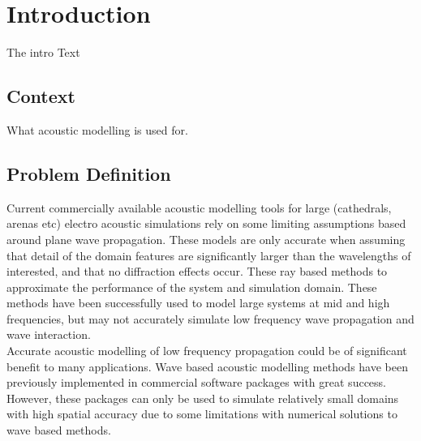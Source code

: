 \chapter{Introduction}

The intro Text

\section{Context}

What acoustic modelling is used for.

\section{Problem Definition}

Current commercially available acoustic modelling tools for large (cathedrals, arenas etc) electro acoustic simulations rely on some limiting assumptions based around plane wave propagation. These models are only accurate when assuming that detail of the domain features are significantly larger than the wavelengths of interested, and that no diffraction effects occur. These ray based methods to approximate the performance of the system and simulation domain. These methods have been successfully used to model large systems at mid and high frequencies, but may not accurately simulate low frequency wave propagation and wave interaction.\\

Accurate acoustic modelling of low frequency propagation could be of significant benefit to many applications. Wave based acoustic modelling methods have been previously implemented in commercial software packages with great success. However, these packages can only be used to simulate relatively small domains with high spatial accuracy due to some limitations with numerical solutions to wave based methods. \\



